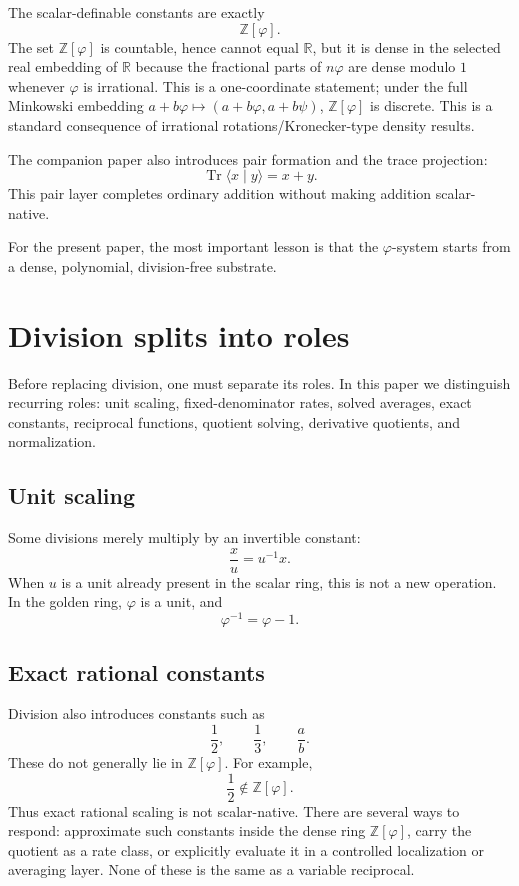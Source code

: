 \documentclass[11pt]{article}
\newcommand{\Tr}{\operatorname{Tr}}
\newcommand{\ph}{\varphi}
\newcommand{\ps}{\psi}
\newcommand{\Z}{\mathbb{Z}}
\newcommand{\R}{\mathbb{R}}
\begin{document}
The scalar-definable constants are exactly
\[
    \Z[\ph].
\]
The set $\Z[\ph]$ is countable, hence cannot equal $\R$, but it is dense in the selected real embedding of $\R$ because the fractional parts of $n\ph$ are dense modulo $1$ whenever $\ph$ is irrational.  This is a one-coordinate statement; under the full Minkowski embedding $a+b\ph\mapsto(a+b\ph,a+b\ps)$, $\Z[\ph]$ is discrete.  This is a standard consequence of irrational rotations/Kronecker-type density results.

The companion paper also introduces pair formation and the trace projection:
\[
    \Tr\langle x\mid y\rangle=x+y.
\]
This pair layer completes ordinary addition without making addition scalar-native.

For the present paper, the most important lesson is that the $\ph$-system starts from a dense, polynomial, division-free substrate.

\section{Division splits into roles}

Before replacing division, one must separate its roles.  In this paper we distinguish recurring roles: unit scaling, fixed-denominator rates, solved averages, exact constants, reciprocal functions, quotient solving, derivative quotients, and normalization.

\subsection{Unit scaling}

Some divisions merely multiply by an invertible constant:
\[
    \frac{x}{u}=u^{-1}x.
\]
When $u$ is a unit already present in the scalar ring, this is not a new operation.  In the golden ring, $\ph$ is a unit, and
\[
    \ph^{-1}=\ph-1.
\]

\subsection{Exact rational constants}

Division also introduces constants such as
\[
    \frac12,
    \qquad
    \frac13,
    \qquad
    \frac{a}{b}.
\]
These do not generally lie in $\Z[\ph]$.  For example,
\[
    \frac12\notin \Z[\ph].
\]
Thus exact rational scaling is not scalar-native.  There are several ways to respond: approximate such constants inside the dense ring \(\Z[\ph]\), carry the quotient as a rate class, or explicitly evaluate it in a controlled localization or averaging layer.  None of these is the same as a variable reciprocal.
\end{document}
